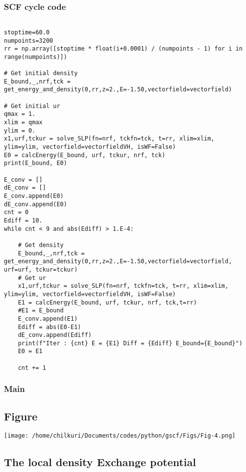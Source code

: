 \documentclass[11pt,a4paper]{article}
\begin{document}
\subsubsection{SCF cycle code}
\label{sec:org7e5a20c}
\begin{verbatim}

stoptime=60.0
numpoints=3200
rr = np.array([stoptime * float(i+0.0001) / (numpoints - 1) for i in range(numpoints)])

# Get initial density
E_bound,_,nrf,tck = get_energy_and_density(0,rr,z=2.,E=-1.50,vectorfield=vectorfield)

# Get initial ur
qmax = 1.
xlim = qmax
ylim = 0.
x1,urf,tckur = solve_SLP(fn=nrf, tckfn=tck, t=rr, xlim=xlim, ylim=ylim, vectorfield=vectorfieldVH, isWF=False)
E0 = calcEnergy(E_bound, urf, tckur, nrf, tck)
print(E_bound, E0)

E_conv = []
dE_conv = []
E_conv.append(E0)
dE_conv.append(E0)
cnt = 0
Ediff = 10.
while cnt < 9 and abs(Ediff) > 1.E-4:

    # Get density
    E_bound,_,nrf,tck = get_energy_and_density(0,rr,z=2.,E=-1.50,vectorfield=vectorfield, urf=urf, tckur=tckur)
    # Get ur
    x1,urf,tckur = solve_SLP(fn=nrf, tckfn=tck, t=rr, xlim=xlim, ylim=ylim, vectorfield=vectorfieldVH, isWF=False)
    E1 = calcEnergy(E_bound, urf, tckur, nrf, tck,t=rr)
    #E1 = E_bound
    E_conv.append(E1)
    Ediff = abs(E0-E1)
    dE_conv.append(Ediff)
    print(f"Iter : {cnt} E = {E1} Diff = {Ediff} E_bound={E_bound}")
    E0 = E1

    cnt += 1
\end{verbatim}
\subsubsection{Main}
\label{sec:org87f3c95}

\subsection{Figure}
\label{sec:orgac83054}
\begin{center}
\texttt{[image: /home/chilkuri/Documents/codes/python/gscf/Figs/Fig-4.png]}
\end{center}

\subsection{The local density Exchange potential}
\label{sec:org03fa1ad}
\end{document}
